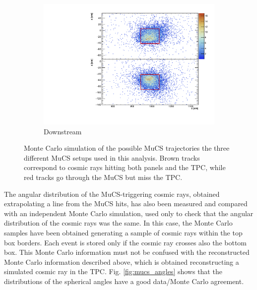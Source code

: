 \documentclass[a4paper]{scrartcl}
\begin{document}
\begin{figure}[htbp]
  \begin{subfigure}{0.32\textwidth}
    \includegraphics[width=\linewidth]{figures/downstream.pdf}
    \caption{Downstream} \label{fig:downstream_align}
  \end{subfigure}

  \caption{Monte Carlo simulation of the possible MuCS trajectories the three different MuCS setups used in this analysis. Brown tracks correspond to cosmic rays hitting both panels and the TPC, while red tracks go through the MuCS but miss the TPC.} \label{fig:alignment}
\end{figure}

The angular distribution of the MuCS-triggering cosmic rays, obtained extrapolating a line from the MuCS hits, has also been measured and compared with an independent Monte Carlo simulation, used only to check that the angular distribution of the cosmic rays was the same.  In this case, the Monte Carlo samples have been obtained generating a sample of cosmic rays within the top box borders. Each event is stored only if the cosmic ray crosses also the bottom box. This Monte Carlo information must not be confused with the reconstructed Monte Carlo information described above, which is obtained reconstructing a simulated cosmic ray in the TPC. Fig. \ref{fig:mucs_angles} shows that the distributions of the spherical angles have a good data/Monte Carlo agreement.
\end{document}
